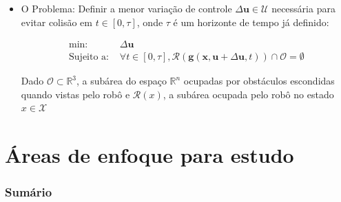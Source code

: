 \documentclass{beamer}
\begin{document}
\begin{frame}[allowframebreaks]
\begin{itemize}
		
		\item O Problema: Definir a menor variação de controle $\Delta\mathbf{u} \in \mathcal{U}$ necessária para evitar colisão em $t \in [0,\tau]$, onde $\tau$ é um horizonte de tempo já definido:
		
		\begin{equation}
		\begin{aligned}
		\text{min: }& \Delta\mathbf{u} \\
		\text{Sujeito a: }& \forall t \in [0,\tau], \mathcal{R}(\mathbf{g}(\mathbf{x}, \mathbf{u}+\Delta\mathbf{u}, t)) \cap \mathcal{O} = \emptyset
		\end{aligned}
		\label{eq:equacaoProb}
		\end{equation}
		
		Dado $\mathcal{O} \subset \mathbb{R}^3$, a subárea do espaço $\mathbb{R}^n$ ocupadas por obstáculos escondidas quando vistas pelo robô e $\mathcal{R}(x)$, a subárea ocupada pelo robô no estado $x \in \mathcal{X}$
		
		
		
	\end{itemize}	 
\end{frame}

\section{Áreas de enfoque para estudo}

\begin{frame}
	\frametitle{Sumário}
	\tableofcontents[currentsection]
\end{frame}
\end{document}
